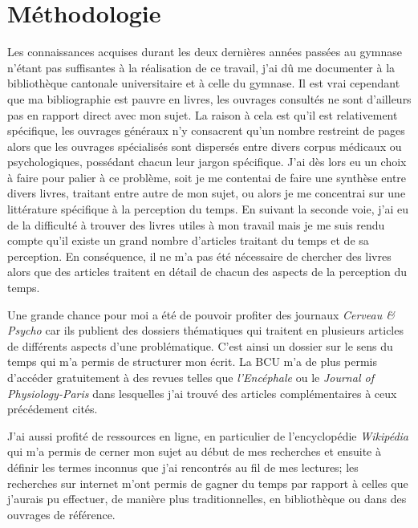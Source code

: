 \documentclass[12pt,fleqn,oneside,french,openany]{book} %
\begin{document}
\section{Méthodologie} \label{sec:methodologie}
Les connaissances acquises durant les deux dernières années passées au gymnase n'étant pas suffisantes à la réalisation de ce travail, j'ai dû me documenter à la bibliothèque cantonale universitaire et à celle du gymnase. Il est vrai cependant que ma bibliographie est pauvre en livres, les ouvrages consultés ne sont d'ailleurs pas en rapport direct avec mon sujet. La raison à cela est qu'il est relativement spécifique, les ouvrages généraux n'y consacrent qu'un nombre restreint de pages alors que les ouvrages spécialisés sont dispersés entre divers corpus médicaux ou psychologiques, possédant chacun leur jargon spécifique. J'ai dès lors eu un choix à faire pour palier à ce problème, soit je me contentai de faire une synthèse entre divers livres, traitant entre autre de mon sujet, ou alors je me concentrai sur une littérature spécifique à la perception du temps. En suivant la seconde voie, j'ai eu de la difficulté à trouver des livres utiles à mon travail mais je me suis rendu compte qu'il existe un grand nombre d'articles traitant du temps et de sa perception. En conséquence, il ne m'a pas été nécessaire de chercher des livres alors que des articles traitent en détail de chacun des aspects de la perception du temps.

Une grande chance pour moi a été de pouvoir profiter des journaux \emph{Cerveau \& Psycho} car ils publient des dossiers thématiques qui traitent en plusieurs articles de différents aspects d'une problématique. C'est ainsi un dossier sur le sens du temps qui m'a permis de structurer mon écrit. 
La BCU m'a de plus permis d'accéder gratuitement à des revues telles que \emph{l'Encéphale} ou le \emph{Journal of Physiology-Paris} dans lesquelles j'ai trouvé des articles complémentaires à ceux précédement cités. 

J'ai aussi profité de ressources en ligne, en particulier de l'encyclopédie \textit{Wikipédia} qui m'a permis de cerner mon sujet au début de mes recherches et ensuite à définir les termes inconnus que j'ai rencontrés au fil de mes lectures; les recherches sur internet m'ont permis de gagner du temps par rapport à celles que j'aurais pu effectuer, de manière plus traditionnelles, en bibliothèque ou dans des ouvrages de référence.
\end{document}
